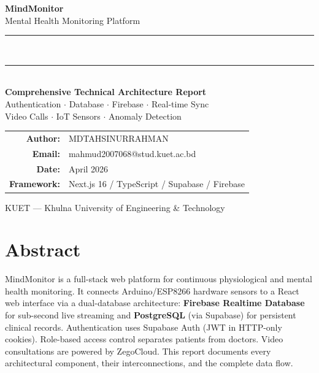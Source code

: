 \documentclass[12pt,a4paper]{report}
\begin{document}
\begin{titlepage}
\pagecolor{dark}\color{white}\centering\vspace*{2.5cm}
{\fontsize{40}{48}\selectfont\bfseries\color{primary}MindMonitor}\\[0.5cm]
{\LARGE\color{white!80}Mental Health Monitoring Platform}\\[1.5cm]
\textcolor{primary}{\rule{12cm}{2pt}}\\[0.3cm]
\textcolor{secondary}{\rule{12cm}{0.8pt}}\\[1.5cm]
{\Large\bfseries Comprehensive Technical Architecture Report}\\[0.4cm]
{\normalsize Authentication $\cdot$ Database $\cdot$ Firebase $\cdot$ Real-time Sync}\\
{\normalsize Video Calls $\cdot$ IoT Sensors $\cdot$ Anomaly Detection}\\[2.5cm]
\begin{tabular}{rl}
\textbf{Author:}    & MDTAHSINURRAHMAN \\[3pt]
\textbf{Email:}     & mahmud2007068@stud.kuet.ac.bd \\[3pt]
\textbf{Date:}      & April 2026 \\[3pt]
\textbf{Framework:} & Next.js 16 / TypeScript / Supabase / Firebase \\
\end{tabular}
\vfill
{\small\color{white!50}KUET --- Khulna University of Engineering \& Technology}
\end{titlepage}
\pagecolor{white}\color{black}

\chapter*{Abstract}
MindMonitor is a full-stack web platform for continuous physiological and mental health monitoring. It connects Arduino/ESP8266 hardware sensors to a React web interface via a dual-database architecture: \textbf{Firebase Realtime Database} for sub-second live streaming and \textbf{PostgreSQL} (via Supabase) for persistent clinical records. Authentication uses Supabase Auth (JWT in HTTP-only cookies). Role-based access control separates patients from doctors. Video consultations are powered by ZegoCloud. This report documents every architectural component, their interconnections, and the complete data flow.

\tableofcontents
\clearpage
\end{document}
